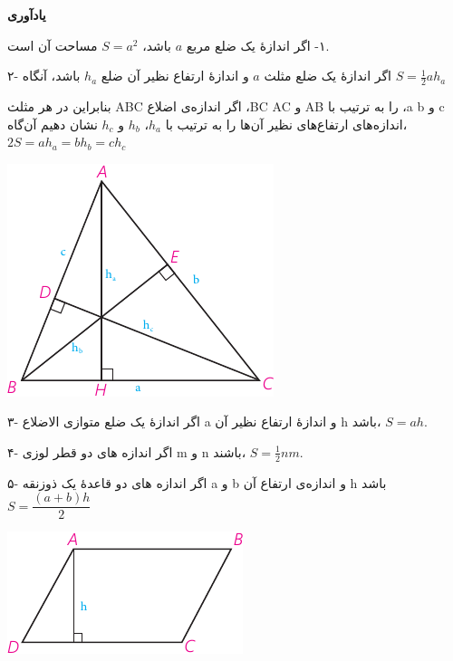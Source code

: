 \documentclass[12pt, a4paper]{book}
\begin{document}
\textbf{یادآوری}

\begin{minipage}{0.65\textwidth}
	١- اگر اندازهٔ یک ضلع مربع $a$ باشد، $S=a^2$ مساحت آن است.
	
	۲- اگر اندازهٔ یک ضلع مثلث $a$ و اندازهٔ ارتفاع نظیر آن ضلع $h_a$ باشد، آنگاه $S = \frac12 ah_a$
	
	بنابراین در هر مثلث ABC اگر اندازه‌ی اضلاع ،BC AC و AB را به ترتیب با ،a b و c اندازه‌های ارتفاع‌های نظیر آن‌ها را به ترتیب با $h_a$، $h_b$ و $h_c$ نشان دهیم آن‌گاه، $2S = ah_a = bh_b = ch_c$
	\end{minipage}
\begin{minipage}{0.3\textwidth}
\begin{flushleft}
		\includegraphics{"Shapes/Fasl - 3/Dars 2/P65-S1"}
\end{flushleft}
\end{minipage}

\begin{minipage}{0.65\textwidth}
	۳- اگر اندازهٔ یک ضلع متوازی الاضلاع a و اندازهٔ ارتفاع نظیر آن h باشد، $S=ah$.
	
	۴- اگر اندازه های دو قطر لوزی m و n باشند، $S=\frac12 nm$.
	
	۵- اگر اندازه های دو قاعدهٔ یک ذوزنقه a و b و اندازه‌ی ارتفاع آن h باشد\\
	 $S = \dfrac{(a+b)h}2$
\end{minipage}
\begin{minipage}{0.3\textwidth}
	\begin{flushleft}
		\includegraphics{"Shapes/Fasl - 3/Dars 2/P65-S2"}
	\end{flushleft}
\end{minipage}
\end{document}
